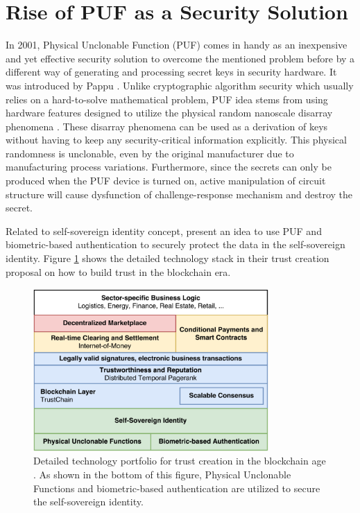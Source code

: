 \section{Rise of PUF as a Security Solution}
\label{ris_puf}
In 2001, Physical Unclonable Function (PUF) comes in handy as an inexpensive and yet effective security solution to overcome the mentioned problem before by a different way of generating and processing secret keys in security hardware. It was introduced by Pappu \cite{Pappu2026}. Unlike cryptographic algorithm security which usually relies on a hard-to-solve mathematical problem, PUF idea stems from using hardware features designed to utilize the physical random nanoscale disarray phenomena \cite{retrospective}. These disarray phenomena can be used as a derivation of keys without having to keep any security-critical information explicitly. This physical randomness is unclonable, even by the original manufacturer due to manufacturing process variations. Furthermore, since the secrets can only be produced when the PUF device is turned on, active manipulation of circuit structure will cause dysfunction of challenge-response mechanism and destroy the secret.

Related to self-sovereign identity concept, \cite{pouwelse} present an idea to use PUF and biometric-based authentication to securely protect the data in the self-sovereign identity. Figure \ref{fig:trust-creation} shows the detailed technology stack in their trust creation proposal on how to build trust in the blockchain era.

\begin{figure}[tph!]
    \centerline{\includegraphics[width={0.8\textwidth}]{images/stack_ssi}}
    \caption{Detailed technology portfolio for trust creation in the blockchain age \cite{pouwelse}. As shown in the bottom of this figure, Physical Unclonable Functions and biometric-based authentication are utilized to secure the self-sovereign identity.}
    \label{fig:trust-creation}
\end{figure}

